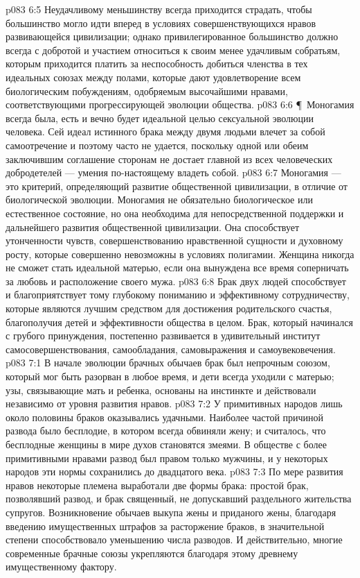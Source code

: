 \vs p083 6:5 Неудачливому меньшинству всегда приходится страдать, чтобы большинство могло идти вперед в условиях совершенствующихся нравов развивающейся цивилизации; однако привилегированное большинство должно всегда с добротой и участием относиться к своим менее удачливым собратьям, которым приходится платить за неспособность добиться членства в тех идеальных союзах между полами, которые дают удовлетворение всем биологическим побуждениям, одобряемым высочайшими нравами, соответствующими прогрессирующей эволюции общества.
\vs p083 6:6 \P\ Моногамия всегда была, есть и вечно будет идеальной целью сексуальной эволюции человека. Сей идеал истинного брака между двумя людьми влечет за собой самоотречение и поэтому часто не удается, поскольку одной или обеим заключившим соглашение сторонам не достает главной из всех человеческих добродетелей --- умения по\hyp{}настоящему владеть собой.
\vs p083 6:7 Моногамия --- это критерий, определяющий развитие общественной цивилизации, в отличие от биологической эволюции. Моногамия не обязательно биологическое или естественное состояние, но она необходима для непосредственной поддержки и дальнейшего развития общественной цивилизации. Она способствует утонченности чувств, совершенствованию нравственной сущности и духовному росту, которые совершенно невозможны в условиях полигамии. Женщина никогда не сможет стать идеальной матерью, если она вынуждена все время соперничать за любовь и расположение своего мужа.
\vs p083 6:8 Брак двух людей способствует и благоприятствует тому глубокому пониманию и эффективному сотрудничеству, которые являются лучшим средством для достижения родительского счастья, благополучия детей и эффективности общества в целом. Брак, который начинался с грубого принуждения, постепенно развивается в удивительный институт самосовершенствования, самообладания, самовыражения и самоувековечения.
\vs p083 7:1 В начале эволюции брачных обычаев брак был непрочным союзом, который мог быть разорван в любое время, и дети всегда уходили с матерью; узы, связывающие мать и ребенка, основаны на инстинкте и действовали независимо от уровня развития нравов.
\vs p083 7:2 У примитивных народов лишь около половины браков оказывались удачными. Наиболее частой причиной развода было бесплодие, в котором всегда обвиняли жену; и считалось, что бесплодные женщины в мире духов становятся змеями. В обществе с более примитивными нравами развод был правом только мужчины, и у некоторых народов эти нормы сохранились до двадцатого века.
\vs p083 7:3 По мере развития нравов некоторые племена выработали две формы брака: простой брак, позволявший развод, и брак священный, не допускавший раздельного жительства супругов. Возникновение обычаев выкупа жены и приданого жены, благодаря введению имущественных штрафов за расторжение браков, в значительной степени способствовало уменьшению числа разводов. И действительно, многие современные брачные союзы укрепляются благодаря этому древнему имущественному фактору.
